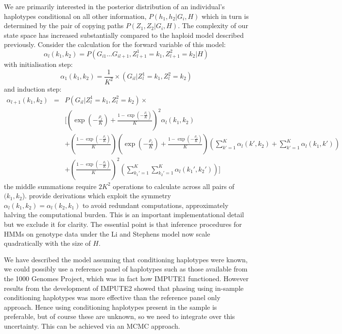  We are primarily interested in the posterior distribution of an individual's haplotypes conditional on all other information, $P(h_1,h_2|G_i,H)$ which in turn is determined by the pair of copying paths $P(Z_1,Z_2|G_i,H)$. The complexity of our state space has increased substantially compared to the haploid model described previously.  Consider the calculation for the forward variable of this model:
$$\alpha_l(k_1,k_2) = P(G_{i1}\ldots G_{il+1},Z_{l+1}^1=k_1,Z_{l+1}^2=k_2|H)$$
with initialisation step:
$$\alpha_1(k_1,k_2) = \frac{1}{K^2} \times (G_{il}|Z^1_l=k_1,Z^2_l=k_2)$$
and induction step:
\begin{eqnarray*}
  \alpha_{l+1}(k_1,k_2) & = & P(G_{il}|Z^1_l=k_1,Z^2_l=k_2) \times\\
  &&\Bigg[  \left(\exp(-\frac{\rho_l}{K}) + \frac{1-\exp(-\frac{\rho_l}{K})}{K}\right)^2 \alpha_l(k_1,k_2)\\
    && + \left( \frac{1-\exp(-\frac{\rho_l}{K})}{K} \right) \left( \exp(-\frac{\rho_l}{K}) + \frac{1-\exp(-\frac{\rho_l}{K})}{K} \right) \left( \sum_{k'=1}^K \alpha_l(k',k_2) + \sum_{k'=1}^K \alpha_l(k_1,k')\right)\\
    && +  \left( \frac{1-\exp(-\frac{\rho_l}{K})}{K} \right)^2 \left( \sum_{k_1'=1}^K \sum_{k_2'=1}^K \alpha_l(k_1',k_2') \right) \Bigg]
\end{eqnarray*}
the middle summations require $2K^2$ operations to calculate across all pairs of $(k_1,k_2$). \cite{scheet2006fast} provide derivations which exploit the symmetry $ \alpha_{l}(k_1,k_2) =  \alpha_{l}(k_2,k_1)$ to avoid redundant computations, approximately halving the computational burden. This is an important implementational detail but we exclude it for clarity. The essential point is that inference procedures for HMMs on genotype data under the Li and Stephens model now scale quadratically with the size of $H$.

We have described the model assuming that conditioning haplotypes were known, we could possibly use a reference panel of haplotypes such as those available from the 1000 Genomes Project, which was in fact how IMPUTE1 functioned.  However results from the development of IMPUTE2 showed that phasing using in-sample conditioning haplotypes was more effective than the reference panel only approach. Hence using conditioning haplotypes present in the sample is preferable, but of course these are unknown, so we need to integrate over this uncertainty. This can be achieved via an MCMC approach.

